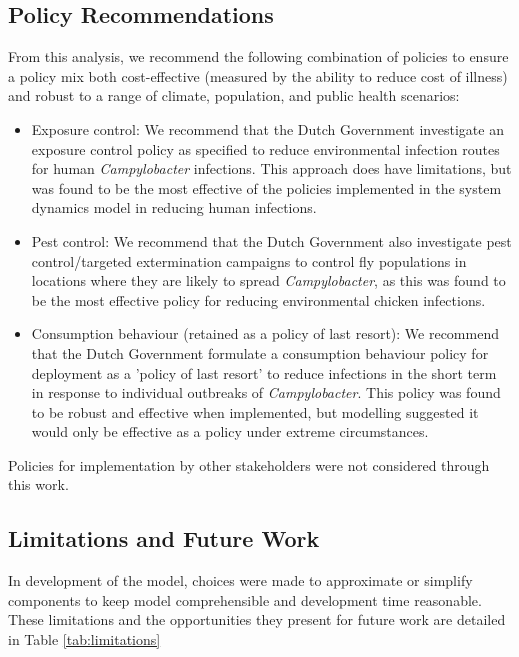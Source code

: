 \subsection{Policy Recommendations}
From this analysis, we recommend the following combination of policies to ensure a policy mix both cost-effective (measured by the ability to reduce cost of illness) and robust to a range of climate, population, and public health scenarios:
\begin{itemize}
    \item Exposure control: We recommend that the Dutch Government investigate an exposure control policy as specified to reduce environmental infection routes for human \textit{Campylobacter} infections. This approach does have limitations, but was found to be the most effective of the policies implemented in the system dynamics model in reducing human infections.
    \item Pest control: We recommend that the Dutch Government also investigate pest control/targeted extermination campaigns to control fly populations in locations where they are likely to spread \textit{Campylobacter}, as this was found to be the most effective policy for reducing environmental chicken infections.
    \item Consumption behaviour (retained as a policy of last resort): We recommend that the Dutch Government formulate a consumption behaviour policy for deployment as a 'policy of last resort' to reduce infections in the short term in response to individual outbreaks of \textit{Campylobacter}. This policy was found to be robust and effective when implemented, but modelling suggested it would only be effective as a policy under extreme circumstances.
\end{itemize}

Policies for implementation by other stakeholders were not considered through this work.
\subsection{Limitations and Future Work}

In development of the model, choices were made to approximate or simplify components to keep model comprehensible and development time reasonable. These limitations and the opportunities they present for future work are detailed in Table \ref{tab:limitations}

